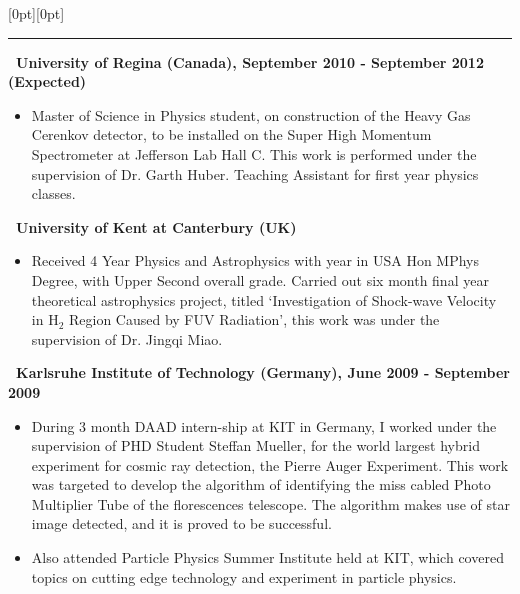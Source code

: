 \documentclass[a4paper,12pt]{letter}
\begin{document}
\secb


\raisebox{0pt}[0pt][0pt]{\Large\textbf{\raisebox{-3.5ex}{History of Study}}} 
\\[2mm]
\rule[-0.5cm]{10cm}{1pt}

\vspace{2mm}

\textbf{\normalsize ~University of Regina (Canada), September 2010 - September 2012 (Expected)} \\[-8mm]
\begin{itemize}
\item \textrm{\normalsize Master of Science in Physics student, on construction of the Heavy Gas Cerenkov detector, to be installed on the Super High Momentum Spectrometer at Jefferson Lab Hall C.  This work is performed under the supervision of Dr. Garth Huber. Teaching Assistant for first year physics classes.}  
\end{itemize}

\textbf{\normalsize ~University of Kent at Canterbury (UK)} \\[-8mm]
\begin{itemize}
\item \textrm{\normalsize Received 4 Year Physics and Astrophysics with year in USA Hon MPhys Degree, with Upper Second overall grade. Carried out six month final year theoretical astrophysics project, titled \lq Investigation of Shock-wave Velocity in H$_2$ Region Caused by FUV Radiation\rq, this work was under the supervision of Dr. Jingqi Miao.} 
\end{itemize}

\textbf{\normalsize ~Karlsruhe Institute of Technology (Germany), June 2009 - September 2009} \\[-8mm] 

\begin{itemize}
\item \textrm{\normalsize During 3 month DAAD intern-ship at KIT in Germany, I worked under the supervision of PHD Student Steffan Mueller, for the world largest hybrid experiment for cosmic ray detection, the Pierre Auger Experiment. This work was targeted to develop the algorithm of identifying the miss cabled Photo Multiplier Tube of the florescences telescope. The algorithm makes use of star image detected, and it is proved to be successful.}
\item \textrm{\normalsize Also attended Particle Physics Summer Institute held at KIT, which covered topics on cutting edge technology and experiment in particle physics.}
\end{itemize}
\end{document}
